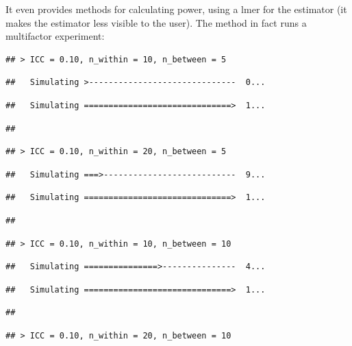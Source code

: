 \documentclass[
]{book}
\begin{document}
It even provides methods for calculating power, using a lmer for the estimator (it makes the estimator less visible to the user).
The method in fact runs a multifactor experiment:

\begin{verbatim}
## > ICC = 0.10, n_within = 10, n_between = 5
\end{verbatim}

\begin{verbatim}
##   Simulating >------------------------------  0...
\end{verbatim}

\begin{verbatim}
##   Simulating ==============================>  1...
\end{verbatim}

\begin{verbatim}
## 
\end{verbatim}

\begin{verbatim}
## > ICC = 0.10, n_within = 20, n_between = 5
\end{verbatim}

\begin{verbatim}
##   Simulating ===>---------------------------  9...
\end{verbatim}

\begin{verbatim}
##   Simulating ==============================>  1...
\end{verbatim}

\begin{verbatim}
## 
\end{verbatim}

\begin{verbatim}
## > ICC = 0.10, n_within = 10, n_between = 10
\end{verbatim}

\begin{verbatim}
##   Simulating ===============>---------------  4...
\end{verbatim}

\begin{verbatim}
##   Simulating ==============================>  1...
\end{verbatim}

\begin{verbatim}
## 
\end{verbatim}

\begin{verbatim}
## > ICC = 0.10, n_within = 20, n_between = 10
\end{verbatim}
\end{document}
